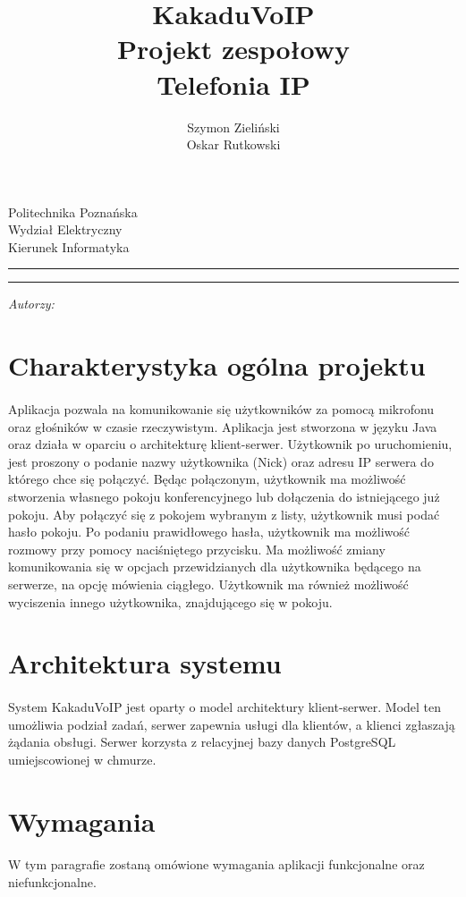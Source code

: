 \documentclass[12pt,a4paper,notitlepage]{report}
\author{\Large{Szymon Zieliński \\ Oskar Rutkowski} }
\title{\textbf{KakaduVoIP} \\[1cm]  Projekt zespołowy  \\ Telefonia IP}
\makeatletter
\newcommand{\linia}{\rule{\linewidth}{0.5mm}}
\renewcommand{\maketitle}{\begin{titlepage}
		
		\vspace*{1cm}
		
		\begin{center}\small
			
			Politechnika Poznańska\\
			
			Wydział Elektryczny\\
			
			Kierunek Informatyka
			
		\end{center}
		
		\vspace{3cm}
		
		\linia
		
		\begin{center}
			
			\LARGE \textsc{\@title}
			
		\end{center}
		
		\linia
		
		\vspace{0.5cm}
		
		\begin{flushright}
			
			\begin{minipage}{5cm}
				
				\textit{ \Large{Autorzy:}}\\
				
				\normalsize{\@author} \par
				
			\end{minipage}
			
		\end{flushright}
		
		\vspace*{\stretch{6}}
		
		\begin{center}
			
			\@date
			
		\end{center}
		
	\end{titlepage}%
	
}
\makeatother
\begin{document}
	
	\maketitle
	\newpage
	\tableofcontents
	\newpage
	
	\section{Charakterystyka ogólna projektu}
	\paragraph*{} Aplikacja pozwala na komunikowanie się użytkowników za pomocą mikrofonu oraz głośników w czasie rzeczywistym. Aplikacja jest stworzona w języku Java oraz działa w oparciu o architekturę klient-serwer. Użytkownik po uruchomieniu, jest proszony o podanie nazwy użytkownika (Nick) oraz adresu IP serwera do którego chce się połączyć. Będąc połączonym, użytkownik ma możliwość stworzenia własnego pokoju konferencyjnego lub dołączenia do istniejącego już pokoju. Aby połączyć się z pokojem wybranym z listy, użytkownik musi podać hasło pokoju. Po podaniu prawidłowego hasła, użytkownik ma możliwość rozmowy przy pomocy naciśniętego przycisku. Ma możliwość zmiany komunikowania się w opcjach przewidzianych dla użytkownika będącego na serwerze, na opcję mówienia ciągłego. Użytkownik ma również możliwość wyciszenia innego użytkownika, znajdującego się w pokoju.
	\section{Architektura systemu}
	\paragraph*{} System KakaduVoIP jest oparty o model architektury klient-serwer. Model ten umożliwia podział zadań, serwer zapewnia usługi dla klientów, a klienci zgłaszają żądania obsługi. Serwer korzysta z relacyjnej bazy danych PostgreSQL umiejscowionej w chmurze.
	\section{Wymagania}
	\paragraph*{} W tym paragrafie zostaną omówione wymagania aplikacji funkcjonalne oraz niefunkcjonalne.
\end{document}
